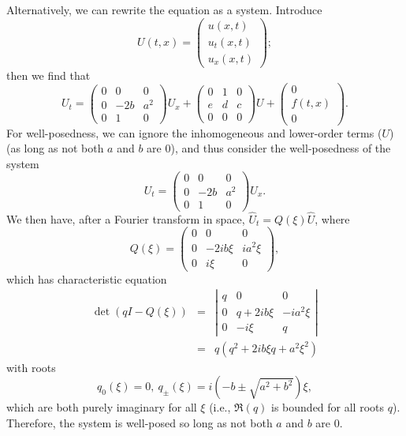 \documentclass{article}
\begin{document}
\begin{enumerate}
\begin{enumerate}
Alternatively, we can rewrite the equation as a system.  Introduce
\[U(t,x) = \left( \begin{array}{c} u(x,t) \\ u_t(x,t) \\ u_x(x,t) \end{array} \right);\]
then we find that
\[U_t = \left( \begin{array}{ccc} 0 & 0 & 0 \\ 0 & -2b & a^2 \\ 0 & 1 & 0 \end{array} \right) U_x
      + \left( \begin{array}{ccc} 0 & 1 & 0 \\ e & d & c \\ 0 & 0 & 0 \end{array} \right) U
      + \left( \begin{array}{c} 0 \\ f(t,x) \\ 0 \end{array} \right).\]
For well-posedness, we can ignore the inhomogeneous and lower-order terms (\(U\)) (as long as not both \(a\) and \(b\) are \(0\)), and thus consider the well-posedness of the system
\[U_t = \left( \begin{array}{ccc} 0 & 0 & 0 \\ 0 & -2b & a^2 \\ 0 & 1 & 0 \end{array} \right) U_x.\]
We then have, after a Fourier transform in space, \(\widehat{U}_t = Q(\xi) \widehat{U}\), where
\[Q(\xi) = \left( \begin{array}{ccc} 0 & 0 & 0 \\ 0 & -2ib\xi & ia^2\xi \\ 0 & i\xi & 0 \end{array} \right),\]
which has characteristic equation
\begin{eqnarray*}
\det(qI - Q(\xi))
& = & \left| \begin{array}{ccc} q & 0 & 0 \\ 0 & q + 2ib\xi & -ia^2\xi \\ 0 & -i\xi & q \end{array} \right| \\
& = & q \left( q^2 + 2ib\xi q + a^2\xi^2 \right)
\end{eqnarray*}
with roots
\[q_0(\xi) = 0, \ q_{\pm}(\xi) = i \left( -b \pm \sqrt{a^2 + b^2} \right) \xi,\]
which are both purely imaginary for all \(\xi\) (i.e., \(\Re(q)\) is bounded for all roots \(q\)).  Therefore, the system is well-posed so long as not both \(a\) and \(b\) are \(0\).


\end{enumerate}
\end{enumerate}
\end{document}
